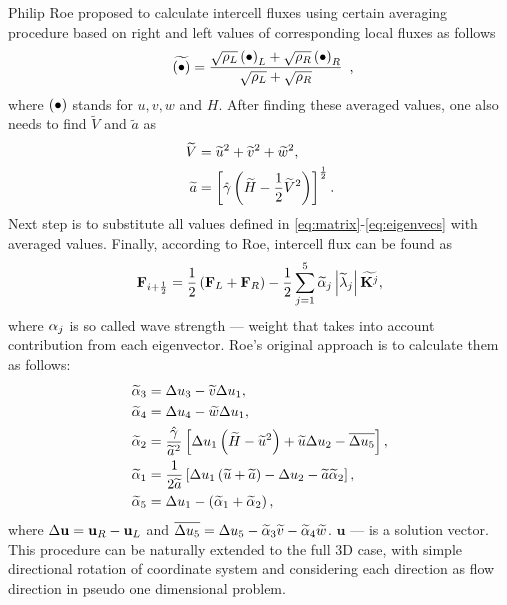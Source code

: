 Philip Roe proposed to calculate intercell fluxes using certain averaging procedure based on right and left values of corresponding local fluxes \cite{lib:Roe} as follows
\begin{align}
\begin{array}{c}
\widetilde {\left(\bullet\right)} = \displaystyle \frac {\sqrt {\rho_L} \left(\bullet\right)_L + \sqrt {\rho_R} \left(\bullet\right)_R}{\sqrt{\rho_L} + \sqrt{\rho_R}}
\end{array},
\end{align}
where $\left(\bullet\right)$ stands for $u, v, w$ and $H$. After finding these averaged values, one also needs to find $\widetilde V$ and $\widetilde a$ as 
\begin{align*}
\widetilde V &= \widetilde u^2 + \widetilde v^2 + \widetilde w^2, \\
\widetilde a &= \left[\hat {\gamma} \left(\widetilde H - \frac 12 \widetilde V^2\right)\right]^{\frac 12}.
\end{align*}
Next step is to substitute all values defined in \eqref{eq:matrix}-\eqref{eq:eigenvecs} with averaged values. Finally, according to Roe, intercell flux can be found as
\begin{align}
\mathbf F_{i+\frac 12} = \frac 12 \left(\mathbf F_L + \mathbf F_R\right) - \frac 12 \sum_{j = 1}^5 	\widetilde {\alpha}_j \left|\widetilde {\lambda}_j\right| \widetilde {\mathbf K^j},
\end{align}
where $\alpha_j$ is so called wave strength --- weight that takes into account contribution from each eigenvector. Roe's original approach is to calculate them as follows:
\begin{align}
\nonumber
\widetilde {\alpha}_3 &= \Delta u_3 - \widetilde v \Delta u_1, \\
\nonumber
\widetilde {\alpha}_4 &= \Delta u_4 - \widetilde w \Delta u_1, \\
\widetilde {\alpha}_2 &= \frac {\hat {\gamma}}{\widetilde a^2} \left[\Delta u_1 \left(\widetilde H - \widetilde u^2\right) + \widetilde u \Delta u_2 - \overline{\Delta u_5}\right], \\
\nonumber
\widetilde {\alpha}_1 &= \frac 1{2 \widetilde a} \left[\Delta u_1 \left(\widetilde u + \widetilde a\right) - \Delta u_2 - \widetilde a \widetilde {\alpha}_2\right], \\
\nonumber
\widetilde {\alpha}_5 &= \Delta u_1 - \left(\widetilde {\alpha}_1 + \widetilde {\alpha}_2\right),
\end{align}
where $\Delta \mathbf u = \mathbf u_R - \mathbf u_L$ and $\overline{\Delta u_5} = \Delta u_5 - \widetilde {\alpha}_3 \widetilde v - \widetilde {\alpha}_4 \widetilde w$. $\mathbf u$ --- is a solution vector. This procedure can be naturally extended to the full 3D case, with simple directional rotation of coordinate system and considering each direction as flow direction in pseudo one dimensional problem.





